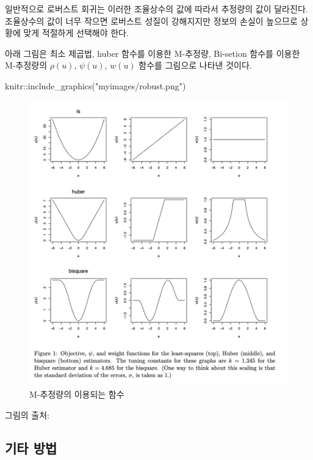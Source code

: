 \documentclass[
  10pt,
]{book}
\newenvironment{Shaded}{\begin{snugshade}}{\end{snugshade}}
\newcommand{\FunctionTok}[1]{\textcolor[rgb]{0.00,0.00,0.00}{#1}}
\newcommand{\NormalTok}[1]{#1}
\newcommand{\SpecialCharTok}[1]{\textcolor[rgb]{0.00,0.00,0.00}{#1}}
\newcommand{\StringTok}[1]{\textcolor[rgb]{0.31,0.60,0.02}{#1}}
\theoremstyle{definition}
\theoremstyle{definition}
\theoremstyle{definition}
\theoremstyle{definition}
\theoremstyle{remark}
\begin{document}
일반적으로 로버스트 회귀는 이러한 조율상수의 값에 따라서 추정량의 값이 달라진다. 조율상수의 값이 너무 작으면 로버스트 성질이 강해지지만 정보의 손실이 높으므로 상황에 맞게 적절하게 선택해야 한다.

아래 그림은 최소 제곱법, huber 함수를 이용한 M-추정량, Bi-setion 함수를 이용한 M-추정량의 \(\rho(u)\), \(\psi(u)\), \(w(u)\) 함수를 그림으로 나타낸 것이다.

\begin{Shaded}
\begin{Highlighting}[]
\NormalTok{knitr}\SpecialCharTok{::}\FunctionTok{include\_graphics}\NormalTok{(}\StringTok{"myimages/robust.png"}\NormalTok{)}
\end{Highlighting}
\end{Shaded}

\begin{figure}

{\centering \includegraphics[width=0.9\linewidth]{myimages/robust} 

}

\caption{M-추정량의 이용되는 함수}\label{fig:unnamed-chunk-41}
\end{figure}

그림의 출처: \citet{fox2018r}

\hypertarget{uxae30uxd0c0-uxbc29uxbc95}{%
\subsection{기타 방법}\label{uxae30uxd0c0-uxbc29uxbc95}}
\end{document}
